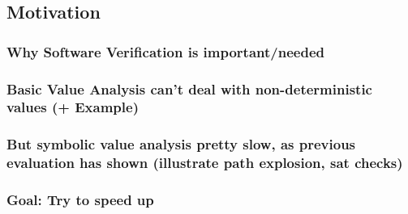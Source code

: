 \subsection{Motivation}
\subsubsection{Why Software Verification is important/needed}
\subsubsection{Basic Value Analysis can't deal with non-deterministic values (+ Example)}
\subsubsection{But symbolic value analysis pretty slow, as previous evaluation has shown (illustrate path explosion, sat checks)}
\subsubsection{Goal: Try to speed up}
